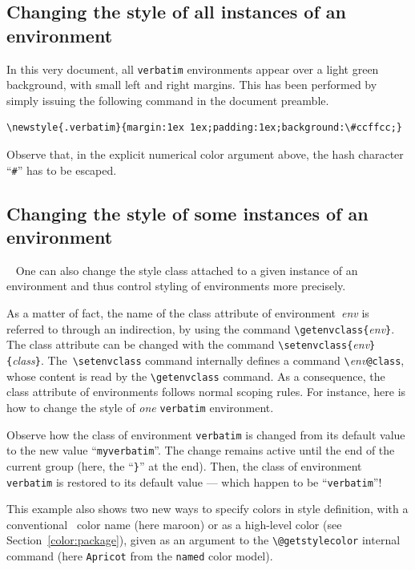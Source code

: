 \subsection{Changing \label{css:change:all}
the style of all instances of an environment}

In this very document, all \texttt{verbatim} environments appear over
a light green background, with small left and right margins.
This has been performed by simply issuing the following command in
the document preamble.
\begin{verbatim}
\newstyle{.verbatim}{margin:1ex 1ex;padding:1ex;background:\#ccffcc;}
\end{verbatim}
Observe that, in the explicit numerical color argument above, the
hash character ``\texttt{\#}'' has to be escaped.

\subsection{Changing \label{css:change}the style of some instances of an environment}\
%
One can also change the style class  attached to a given instance of
an environment and thus control styling of environments more precisely.

As a matter of fact, the name of the class attribute of
environment~\textit{env} is referred to through an indirection, by
using the command \verb+\getenvclass{+\textit{env}\verb+}+.
The class attribute can be changed with the command
\verb+\setenvclass{+\textit{env}\verb+}{+\textit{class}\verb+}+.
The~\verb+\setenvclass+ command internally defines a command
\verb+\+\textit{env}\verb+@class+, whose content is read
by the \verb+\getenvclass+ command. As a consequence, the class
attribute of environments follows normal scoping rules.
\label{getstylecolor:example}
For instance, here is how to change the style of \emph{one} \texttt{verbatim}
environment.
\bgroup{}

\egroup
Observe how the class of environment \texttt{verbatim} is changed from
its default value to the
new value ``\texttt{myverbatim}''. The change remains active until the
end of the current group (here, the ``\texttt{\}}'' at the end). Then, the class
of environment \texttt{verbatim} is restored to its default value
--- which happen to be ``\texttt{verbatim}''!

This example also shows two new ways to specify colors in style
definition, with a
conventional \html~color name (here {\ifhevea\maroon\fi maroon}) or as
a high-level color (see Section~\ref{color:package}), given as an argument to
the \verb+\@getstylecolor+ internal command
(here \colorbox{abricot}{\texttt{Apricot}} from the \texttt{named} color model).


